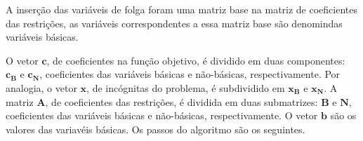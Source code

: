 A inserção das variáveis de folga foram uma matriz base na matriz de coeficientes das restrições, as variáveis correspondentes a essa matriz base são denomindas variáveis básicas.

O vetor $\mathbf{c}$, de coeficientes na função objetivo, é dividido em duas componentes: $\mathbf{c{_B}}$ e $\mathbf{c{_N}}$, coeficientes das variáveis básicas e não-básicas, respectivamente. Por analogia, o vetor $\mathbf{x}$, de incógnitas do problema, é subdividido em $\mathbf{x{_B}}$ e $\mathbf{x{_N}}$.  A matriz $\mathbf{A}$, de coeficientes das restrições, é dividida em duas submatrizes: $\mathbf{B}$ e $\mathbf{N}$, coeficientes das variáveis básicas e não-básicas, respectivamente. O vetor $\textbf{b}$ são os valores das variavéis básicas. Os passos do algoritmo são os seguintes.\\

